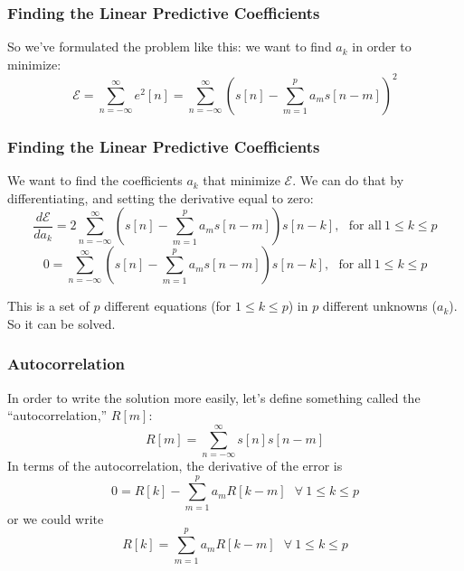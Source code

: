 \documentclass{beamer}
\begin{document}
\begin{frame}
  \frametitle{Finding the Linear Predictive Coefficients}

  So we've formulated the problem like this: we want to find $a_k$ in
  order to minimize:
  \begin{displaymath}
    {\mathcal E}=\sum_{n=-\infty}^\infty e^2[n] =
    \sum_{n=-\infty}^\infty\left(s[n]-\sum_{m=1}^p a_m s[n-m]\right)^2
  \end{displaymath}
\end{frame}
\begin{frame}
  \frametitle{Finding the Linear Predictive Coefficients}
  
  We want to find the coefficients $a_k$ that minimize ${\mathcal E}$.  We can do that by
  differentiating, and setting the derivative equal to zero:
  \begin{displaymath}
    \frac{d{\mathcal E}}{da_k} =
    2\sum_{n=-\infty}^\infty \left(s[n]-\sum_{m=1}^pa_m s[n-m]\right)s[n-k],~~~\mbox{for all}~1\le k\le p
  \end{displaymath}
  \begin{displaymath}
    0 = 
    \sum_{n=-\infty}^\infty \left(s[n]-\sum_{m=1}^pa_ms[n-m]\right)s[n-k],~~~\mbox{for all}~1\le k\le p
  \end{displaymath}

  This is a set of $p$ different equations (for $1\le k\le p$) in $p$
  different unknowns ($a_k$).  So it can be solved.
\end{frame}

\begin{frame}
  \frametitle{Autocorrelation}

  In order to write the solution more easily, let's define something
  called the ``autocorrelation,'' $R[m]$:
  \begin{displaymath}
    R[m] = \sum_{n=-\infty}^\infty s[n]s[n-m]
  \end{displaymath}
  In terms of the autocorrelation, the derivative of the error is
  \begin{displaymath}
    0 = R[k] -\sum_{m=1}^pa_m R[k-m]~~~\forall~1\le k\le p
  \end{displaymath}
  or we could write 
  \begin{displaymath}
    R[k] = \sum_{m=1}^pa_m R[k-m]~~~\forall~1\le k\le p
  \end{displaymath}
\end{frame}
\end{document}
